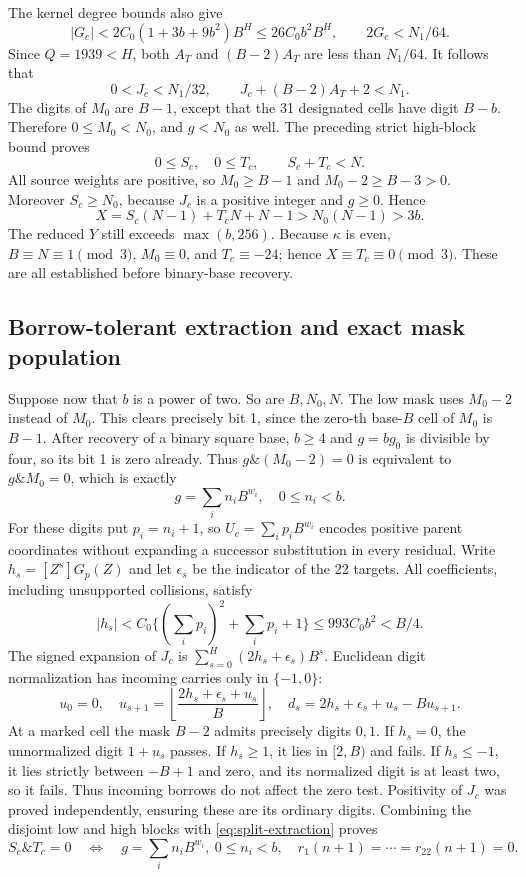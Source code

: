 The kernel degree bounds also give
\[
 |G_c|<2C_0(1+3b+9b^2)B^H\le26C_0b^2B^H,\qquad
 2G_c<N_1/64.
\]
Since $Q=1939<H$, both $A_T$ and $(B-2)A_T$ are less than $N_1/64$.
It follows that
\[
 0<J_c<N_1/32,\qquad J_c+(B-2)A_T+2<N_1.
\]
The digits of $M_0$ are $B-1$, except that the 31 designated cells
have digit $B-b$. Therefore $0\le M_0<N_0$, and $g<N_0$ as well.
The preceding strict high-block bound proves
\begin{equation}\label{eq:split-tight-range}
 0\le S_c,\quad0\le T_c,\qquad S_c+T_c<N.
\end{equation}
All source weights are positive, so $M_0\ge B-1$ and $M_0-2\ge B-3>0$. Moreover $S_c\ge N_0$, because $J_c$ is a positive integer and $g\ge0$. Hence
\[
X=S_c(N-1)+T_cN+N-1>N_0(N-1)>3b.
\]
The reduced $Y$ still exceeds $\max(b,256)$. Because $\kappa$ is
even, $B\equiv N\equiv1\pmod3$, $M_0\equiv0$, and
$T_c\equiv-24$; hence $X\equiv T_c\equiv0\pmod3$.
These are all established before binary-base recovery.

\subsection{Borrow-tolerant extraction and exact mask population}

Suppose now that $b$ is a power of two. So are $B,N_0,N$. The low
mask uses $M_0-2$ instead of $M_0$. This clears precisely bit 1, since the zero-th base-$B$ cell of $M_0$ is $B-1$. After recovery of a binary square base, $b\ge4$ and $g=bg_0$ is divisible by four, so its bit 1 is zero already. Thus $g\mathbin{\&}(M_0-2)=0$ is equivalent to $g\mathbin{\&}M_0=0$, which is exactly
\[
 g=\sum_i n_iB^{w_i},\quad0\le n_i<b.
\]
For these digits put $p_i=n_i+1$, so $U_c=\sum_i p_iB^{w_i}$ encodes
positive parent coordinates without expanding a successor substitution
in every residual. Write $h_s=[Z^s]G_p(Z)$ and let $\epsilon_s$ be the
indicator of the 22 targets. All coefficients, including unsupported
collisions, satisfy
\[
 |h_s|<C_0\{(\sum_i p_i)^2+\sum_i p_i+1\}
 \le993C_0b^2<B/4.
\]
The signed expansion of $J_c$ is $\sum_{s=0}^{H}(2h_s+\epsilon_s)B^s$.
Euclidean digit normalization has incoming carries only in $\{-1,0\}$:
\[
 u_0=0,\quad u_{s+1}=\left\lfloor\frac{2h_s+\epsilon_s+u_s}{B}\right\rfloor,
 \quad d_s=2h_s+\epsilon_s+u_s-Bu_{s+1}.
\]
At a marked cell the mask $B-2$ admits precisely digits $0,1$.
If $h_s=0$, the unnormalized digit $1+u_s$ passes. If $h_s\ge1$,
it lies in $[2,B)$ and fails. If $h_s\le-1$, it lies strictly between
$-B+1$ and zero, and its normalized digit is at least two, so it fails.
Thus incoming borrows do not affect the zero test. Positivity of $J_c$
was proved independently, ensuring these are its ordinary digits.
Combining the disjoint low and high blocks with
\eqref{eq:split-extraction} proves
\[
 S_c\mathbin{\&}T_c=0
 \quad\Longleftrightarrow\quad
 g=\sum_i n_iB^{w_i},\ 0\le n_i<b,\quad r_1(n+1)=\cdots=r_{22}(n+1)=0.
\]


